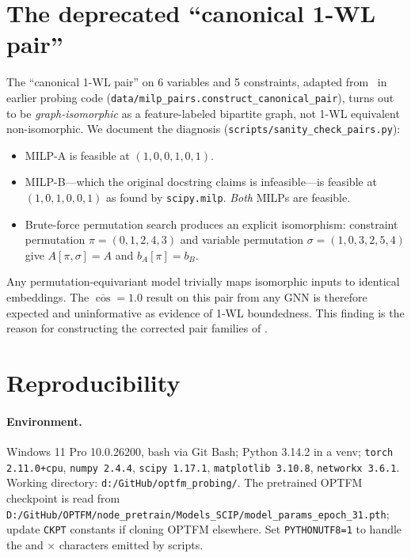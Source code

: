 \documentclass[11pt]{article}
\theoremstyle{plain}
\theoremstyle{definition}
\theoremstyle{remark}
\newcommand{\optfm}{\textsc{OPTFM}}
\begin{document}
\appendix

\section{The deprecated ``canonical 1-WL pair''}
\label{app:broken-canonical}

The ``canonical 1-WL pair'' on 6 variables and 5 constraints, adapted
from~\cite{chen2023expressive} in earlier probing code (\texttt{data/milp\_pairs.construct\_canonical\_pair}),
turns out to be \emph{graph-isomorphic} as a feature-labeled bipartite
graph, not 1-WL equivalent non-isomorphic. We document the diagnosis
(\texttt{scripts/sanity\_check\_pairs.py}):
\begin{itemize}[leftmargin=18pt, topsep=0pt, itemsep=1pt]
    \item MILP-A is feasible at $(1,0,0,1,0,1)$.
    \item MILP-B---which the original docstring claims is infeasible---is
    feasible at $(1,0,1,0,0,1)$ as found by \texttt{scipy.milp}. \emph{Both}
    MILPs are feasible.
    \item Brute-force permutation search produces an explicit isomorphism:
    constraint permutation $\pi=(0,1,2,4,3)$ and variable permutation
    $\sigma=(1,0,3,2,5,4)$ give $A[\pi,\sigma]=A$ and $b_A[\pi]=b_B$.
\end{itemize}
Any permutation-equivariant model trivially maps isomorphic inputs to
identical embeddings. The $\overline{\cos}\!=\!1.0$ result on this pair
from any GNN is therefore expected and uninformative as evidence of 1-WL
boundedness. This finding is the reason for constructing the corrected
pair families of .

\section{Reproducibility}
\label{app:repro}

\paragraph{Environment.}
Windows 11 Pro 10.0.26200, bash via Git Bash; Python 3.14.2 in a venv;
\texttt{torch 2.11.0+cpu}, \texttt{numpy 2.4.4}, \texttt{scipy 1.17.1},
\texttt{matplotlib 3.10.8}, \texttt{networkx 3.6.1}. Working directory:
\texttt{d:/GitHub/optfm\_probing/}. The pretrained \optfm{} checkpoint is
read from \texttt{D:/GitHub/OPTFM/node\_pretrain/Models\_SCIP/model\_params\_epoch\_31.pth};
update \texttt{CKPT} constants if cloning OPTFM elsewhere. Set
\texttt{PYTHONUTF8=1} to handle the \checkmark and $\times$ characters
emitted by scripts.
\end{document}
